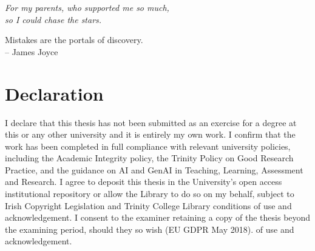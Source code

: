 \documentclass[a4paper]{book}
\numberwithin{equation}{chapter}
\begin{document}




\thispagestyle{empty}
\mbox{}

\newpage
\thispagestyle{empty}
\vspace*{\fill}
\begin{center}
 \Large \textit{For my parents, who supported me so much, \\ so I could chase the stars.}
\end{center}
\vspace*{\fill}

\clearpage
\thispagestyle{empty}
\null
\clearpage

\thispagestyle{empty}
\vspace*{\fill}
\begin{center}
  \Large 
Mistakes are the portals of discovery. \\ 
-- James Joyce 
\end{center}
\vspace*{\fill}

\newpage
\thispagestyle{empty}
\hspace{0pt}
\vfill
\section*{Declaration}
I declare that this thesis has not been submitted as an exercise for a degree at this or any other
university and it is entirely my own work. I confirm that the work has been completed in full
compliance with relevant university policies, including the Academic Integrity policy, the
Trinity Policy on Good Research Practice, and the guidance on AI and GenAI in Teaching,
Learning, Assessment and Research.
I agree to deposit this thesis in the University’s open access institutional repository or allow
the Library to do so on my behalf, subject to Irish Copyright Legislation and Trinity College
Library conditions of use and acknowledgement.
I consent to the examiner retaining a copy of the thesis beyond the examining
period, should they so wish (EU GDPR May 2018).
of use and acknowledgement.
\vspace{1cm}
\end{document}
